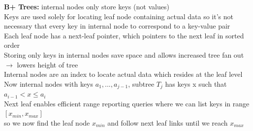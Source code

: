 \documentclass{article}
\begin{document}
  \textbf{B+ Trees: }internal nodes only store keys (not values)\\
  Keys are used solely for locating leaf node containing actual data so it's not necessary that every key in internal node to correspond to a key-value pair\\
  Each leaf node has a next-leaf pointer, which pointers to the next leaf in sorted order \\
  Storing only keys in internal nodes save space and allows increased tree fan out $\rightarrow$ lowers height of tree\\
  Internal nodes are an index to locate actual data which resides at the leaf level\\
  Now internal nodes with keys $a_{1}, ..., a_{j-1}$, subtree $T_{j}$ has keys x such that $a_{i-1} < x \leq a_{i}$\\
  Next leaf enables efficient range reporting queries where we can list keys in range $[x_{min}, x_{max}]$\\
  \indent so we now find the leaf node $x_{min}$ and follow next leaf links until we reach $x_{max}$\\
  \newpage
\end{document}
